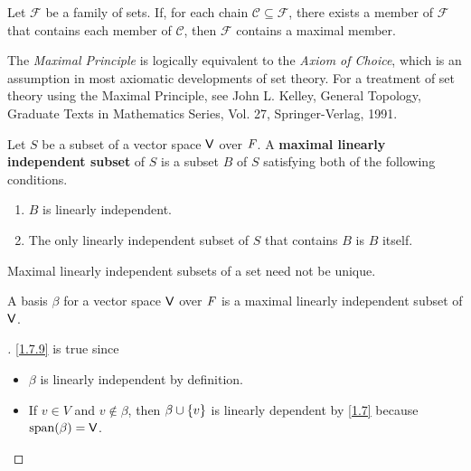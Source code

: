 \begin{ax}\label{1.7.7}
  Let \(\mathcal{F}\) be a family of sets.
  If, for each chain \(\mathcal{C} \subseteq \mathcal{F}\), there exists a member of \(\mathcal{F}\) that contains each member of \(\mathcal{C}\), then \(\mathcal{F}\) contains a maximal member.
\end{ax}

\begin{note}
  The \emph{Maximal Principle} is logically equivalent to the \emph{Axiom of Choice}, which is an assumption in most axiomatic developments of set theory.
  For a treatment of set theory using the Maximal Principle, see John L. Kelley, General Topology, Graduate Texts in Mathematics Series, Vol. 27, Springer-Verlag, 1991.
\end{note}

\begin{defn}\label{1.7.8}
  Let \(S\) be a subset of a vector space \(\mathsf{V}\) over \(\mathit{F}\).
  A \textbf{maximal linearly independent subset} of \(S\) is a subset \(B\) of \(S\) satisfying both of the following conditions.
  \begin{enumerate}
    \item \(B\) is linearly independent.
    \item The only linearly independent subset of \(S\) that contains \(B\) is \(B\) itself.
  \end{enumerate}
\end{defn}

\begin{note}
  Maximal linearly independent subsets of a set need not be unique.
\end{note}

\begin{eg}\label{1.7.9}
  A basis \(\beta\) for a vector space \(\mathsf{V}\) over \(\mathit{F}\) is a maximal linearly independent subset of \(\mathsf{V}\).
\end{eg}

\begin{proof}[]
  \cref{1.7.9} is true since
  \begin{itemize}
    \item \(\beta\) is linearly independent by definition.
    \item If \(v \in V\) and \(v \notin \beta\), then \(\beta \cup \left\lbrace v\right\rbrace\) is linearly dependent by \cref{1.7} because \(\spn{\beta} = \V\).
  \end{itemize}
\end{proof}

